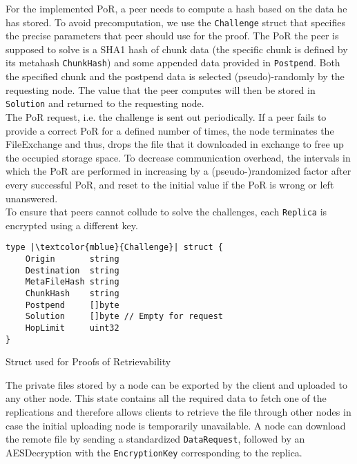 \documentclass{article}
\begin{document}
\label{par:PoR}
For the implemented PoR, a peer needs to compute a hash based on the data he has stored. To avoid precomputation, we use the \texttt{Challenge} struct that specifies the precise parameters that peer should use for the proof. The PoR the peer is supposed to solve is a SHA1 hash of chunk data (the specific chunk is defined by its metahash \texttt{ChunkHash}) and some appended data provided in \texttt{Postpend}. Both the specified chunk and the postpend data is selected (pseudo)-randomly by the requesting node. The value that the peer computes will then be stored in \texttt{Solution} and returned to the requesting node.
\\
The PoR request, i.e. the challenge is sent out periodically. If a peer fails to provide a correct PoR for a defined number of times, the node terminates the FileExchange and thus, drops the file that it downloaded in exchange to free up the occupied storage space. 
To decrease communication overhead, the intervals in which the PoR are performed in increasing by a (pseudo-)randomized factor after every successful PoR, and reset to the initial value if the PoR is wrong or left unanswered.
\\
To ensure that peers cannot collude to solve the challenges, each \texttt{Replica} is encrypted using a different key.  

\begin{listing}
\begin{verbatim}
type |\textcolor{mblue}{Challenge}| struct {
	Origin       string
	Destination  string
	MetaFileHash string
	ChunkHash    string
	Postpend     []byte
	Solution     []byte // Empty for request
	HopLimit     uint32
}
\end{verbatim}
\caption{Struct used for Proofs of Retrievability}
\end{listing}

The private files stored by a node can be exported by the client and uploaded to any other node. This state contains all the required data to fetch one of the replications and therefore allows clients to retrieve the file through other nodes in case the initial uploading node is temporarily unavailable. A node can download the remote file by sending a standardized \texttt{DataRequest}, followed by an AESDecryption with the \texttt{EncryptionKey} corresponding to the replica. 
\\\vspace{0.5em}
\end{document}
